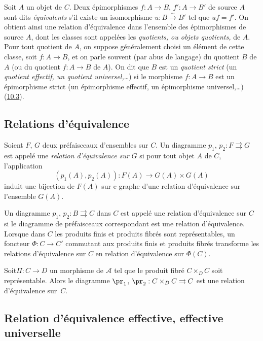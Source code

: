 \etc\pageoriginale

Soit $A$ un objet de $C$. Deux épimorphismes $f:A\rightarrow B$,
$f':A\rightarrow B'$ de source $A$ sont dits \emph{équivalents} s'il
existe un isomorphisme $u:B\xrightarrow{\sim}B'$ tel que $uf=f'$. On
obtient ainsi une relation d'équivalence dans l'ensemble des
épimorphismes de source $A$, dont les classes sont appelées les
\emph{quotients, ou objets quotients,} de $A$. Pour tout quotient de
$A$, on suppose généralement choisi un élément de cette classe, soit
$f:A\rightarrow B$, et on parle souvent (par abus de langage) du
quotient $B$ de $A$ (ou du quotient $f:A\rightarrow B$ de $A$). On
dit que $B$ est un \emph{quotient strict} (\resp un \emph{quotient
effectif, \resp un quotient universel,}\ldots) si le morphisme
$f:A\rightarrow B$ est un épimorphisme strict (\resp un épimorphisme
effectif, \resp un épimorphisme universel,\ldots) (\hyperref[I.sec10.3]{10.3}).

\subsection{Relations d'équivalence}

Soient $F$, $G$ deux préfaisceaux d'ensembles sur $C$. Un diagramme
$p_1$, $p_2:F\rightrightarrows G$ est appelé une \emph{relation
d'équivalence sur} $G$ si pour tout objet $A$ de $C$, l'application
$$
(p_1(A),p_2(A)):F(A)\longrightarrow G(A)\times G(A)
$$
induit une bijection de $F(A)$ sur e graphe d'une relation
d'équivalence sur l'ensemble $G(A)$.

Un diagramme $p_1$, $p_2:B\rightrightarrows C$ dans $C$ est appelé
une relation d'équivalence sur $C$ si le diagramme de préfaisceaux
correspondant est une relation d'équivalence. Lorsque dans $C$ les
produits finis et produits fibrés sont représentables, un foncteur
$\Phi:C\rightarrow C'$ commutant aux produits finis et produits
fibrés transforme les relations d'équivalence sur $C$ en relation
d'équivalence sur $\Phi (C)$.

Soit\pageoriginale $\Pi:C\rightarrow D$ un morphisme de $𝒜$
tel que le produit fibré $C\times_D C$ soit représentable. Alors le
diagramme $\pr_1$, $\pr_2:C\times_D C\rightrightarrows C$ est une
relation d'équivalence sur~$C$.

\subsection{Relation d'équivalence effective, effective universelle}

